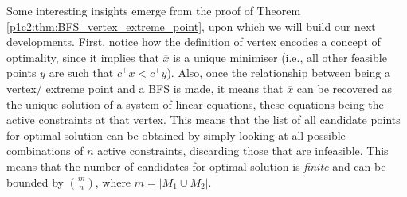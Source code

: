 Some interesting insights emerge from the proof of Theorem \ref{p1c2:thm:BFS_vertex_extreme_point}, upon which we will build our next developments. First, notice how the definition of vertex encodes a concept of optimality, since it implies that $\overline{x}$ is a unique minimiser (i.e., all other feasible points $y$ are such that $c^\top\overline{x} < c^\top y$). Also, once the relationship between being a vertex/ extreme point and a BFS is made, it means that $\overline{x}$ can be recovered as the unique solution of a system of linear equations, these equations being the active constraints at that vertex. This means that the list of all candidate points for optimal solution can be obtained by simply looking at all possible combinations of $n$ active constraints, discarding those that are infeasible. This means that the number of candidates for optimal solution is \emph{finite} and can be bounded by $\binom{m}{n}$, where $m=| M_1 \cup M_2 |$. 


 

